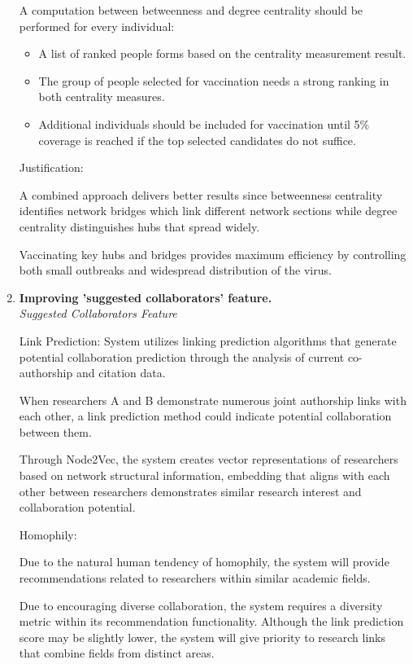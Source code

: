 \documentclass[a4paper,12pt]{article}
\begin{document}
\begin{enumerate}[label=\textbf{Q\arabic*.}]
    A computation between betweenness and degree centrality should be performed for every individual:
    \begin{itemize}
        \item A list of ranked people forms based on the centrality measurement result.
        \item The group of people selected for vaccination needs a strong ranking in both centrality measures.
        \item Additional individuals should be included for vaccination until 5\% coverage is reached if the top selected candidates do not suffice.
    \end{itemize}

    Justification:

    A combined approach delivers better results since betweenness centrality identifies network bridges which link different network sections while degree centrality distinguishes hubs that spread widely.

    Vaccinating key hubs and bridges provides maximum efficiency by controlling both small outbreaks and widespread distribution of the virus.
    
    \item \textbf{Improving 'suggested collaborators' feature.} \\
    \textit{Suggested Collaborators Feature}

    Link Prediction: System utilizes linking prediction algorithms that generate potential collaboration prediction through the analysis of current co-authorship and citation data.

    When researchers A and B demonstrate numerous joint authorship links with each other, a link prediction method could indicate potential collaboration between them.

    Through Node2Vec, the system creates vector representations of researchers based on network structural information, embedding that aligns with each other between researchers demonstrates similar research interest and collaboration potential.

    Homophily:

    Due to the natural human tendency of homophily, the system will provide recommendations related to researchers within similar academic fields.

    Due to encouraging diverse collaboration, the system requires a diversity metric within its recommendation functionality. Although the link prediction score may be slightly lower, the system will give priority to research links that combine fields from distinct areas.
    

\end{enumerate}
\end{document}
